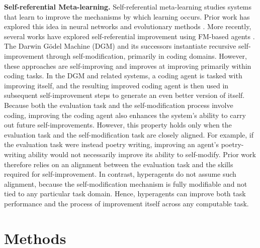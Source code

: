 \documentclass[]{fairmeta}
\begin{document}
\textbf{Self-referential Meta-learning.}
Self-referential meta-learning studies systems that learn to improve the mechanisms by which learning occurs. Prior work has explored this idea in neural networks \citep{kirsch2022eliminating, jackson2024discovering} and evolutionary methods \citep{lu2023arbitrary}. More recently, several works have explored self-referential improvement using FM-based agents \citep{zelikman2024self, robeyns2025self, yin2025godel, zhang2025darwin}. The Darwin G\"odel Machine (DGM) \citep{zhang2025darwin} and its successors \citep{wang2025huxley, xia2025live, weng2026group} instantiate recursive self-improvement through self-modification, primarily in coding domains. However, these approaches are self-improving and improves at improving primarily within coding tasks.
In the DGM and related systems, a coding agent is tasked with improving itself, and the resulting improved coding agent is then used in subsequent self-improvement steps to generate an even better version of itself. Because both the evaluation task and the self-modification process involve coding, improving the coding agent also enhances the system's ability to carry out future self-improvements. However, this property holds only when the evaluation task and the self-modification task are closely aligned. For example, if the evaluation task were instead poetry writing, improving an agent's poetry-writing ability would not necessarily improve its ability to self-modify. Prior work therefore relies on an alignment between the evaluation task and the skills required for self-improvement. In contrast, hyperagents do not assume such alignment, because the self-modification mechanism is fully modifiable and not tied to any particular task domain. Hence, hyperagents can improve both task performance and the process of improvement itself across any computable task.

\section{Methods}
\label{sec:method}
\end{document}
